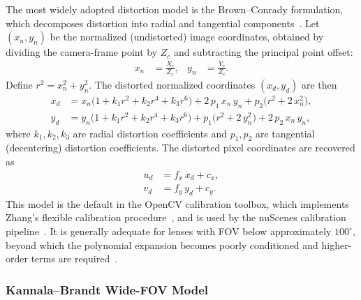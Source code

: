 The most widely adopted distortion model is the Brown--Conrady formulation, which decomposes distortion into radial and tangential components~\cite{zhang2000flexible}. Let $(x_n, y_n)$ be the normalized (undistorted) image coordinates, obtained by dividing the camera-frame point by $Z_c$ and subtracting the principal point offset:
\begin{align}
  x_n &= \frac{X_c}{Z_c}, &
  y_n &= \frac{Y_c}{Z_c}.
\end{align}
Define $r^2 = x_n^2 + y_n^2$. The distorted normalized coordinates $(x_d, y_d)$ are then
\begin{align}
  x_d &= x_n\bigl(1 + k_1 r^2 + k_2 r^4 + k_3 r^6\bigr)
         + 2\,p_1\,x_n\,y_n + p_2\bigl(r^2 + 2\,x_n^2\bigr), \label{eq:brown_x}\\
  y_d &= y_n\bigl(1 + k_1 r^2 + k_2 r^4 + k_3 r^6\bigr)
         + p_1\bigl(r^2 + 2\,y_n^2\bigr) + 2\,p_2\,x_n\,y_n, \label{eq:brown_y}
\end{align}
where $k_1, k_2, k_3$ are radial distortion coefficients and $p_1, p_2$ are tangential (decentering) distortion coefficients. The distorted pixel coordinates are recovered as
\begin{align}
  u_d &= f_x\,x_d + c_x, \label{eq:distorted_u}\\
  v_d &= f_y\,y_d + c_y. \label{eq:distorted_v}
\end{align}
This model is the default in the OpenCV calibration toolbox, which implements Zhang's flexible calibration procedure~\cite{zhang2000flexible}, and is used by the nuScenes calibration pipeline~\cite{Caesar2020nuScenes}. It is generally adequate for lenses with FOV below approximately $100^\circ$, beyond which the polynomial expansion becomes poorly conditioned and higher-order terms are required~\cite{kannala2006generic}.

\subsubsection{Kannala--Brandt Wide-FOV Model}

